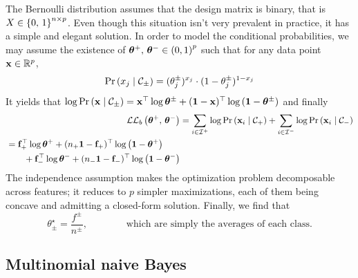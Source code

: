 The Bernoulli distribution assumes that the design matrix is binary,
that is $X \in \left\{ 0,\, 1 \right\}^{n \times p}$.
Even though this situation isn't very prevalent in practice, it has a simple and elegant solution.
In order to model the conditional probabilities, we may assume the existence of
$\bm{\theta}^+,\, \bm{\theta}^- \in \left( 0, 1 \right)^p$
such that for any data point $\mathbf{x} \in \mathbb{R}^p$,
\begin{equation*}
    \Pr\left( x_j \mid \mathcal{C}_\pm \right) = (\theta^\pm_j)^{x_j} \cdot (1 - \theta^\pm_j)^{1 - x_j}
\end{equation*}
It yields that $\log \Pr\left( \mathbf{x} \mid \mathcal{C}_\pm \right) =
\mathbf{x}^\top\log\bm{\theta}^\pm + (\mathbf{1} - \mathbf{x})^\top\log\left( \mathbf{1} - \bm{\theta}^\pm \right)$
and finally
\begin{align}\label{eq:bernoulli_snb_ll}
    \mathcal{L}\mathcal{L}_b\left( \bm{\theta}^+,\, \bm{\theta}^- \right)
    &= \sum_{i \in \mathcal{I}^+} \log \Pr\left( \mathbf{x}_i \mid \mathcal{C}_+ \right)
        + \sum_{i \in \mathcal{I}^-} \log \Pr\left( \mathbf{x}_i \mid \mathcal{C}_- \right)\nonumber\\
    \begin{split}
        &= \mathbf{f}_+^\top\log\bm{\theta}^+ + (n_+\mathbf{1} - \mathbf{f}_+)^\top\log\left( \mathbf{1} - \bm{\theta}^+ \right)\\
        &\qquad+ \mathbf{f}_-^\top\log\bm{\theta}^- + (n_-\mathbf{1} - \mathbf{f}_-)^\top\log\left( \mathbf{1} - \bm{\theta}^- \right)
    \end{split}
\end{align}
The independence assumption makes the optimization problem decomposable across features;
it reduces to $p$ simpler maximizations, each of them being concave and admitting a closed-form solution.
Finally, we find that
\begin{equation*}
    \theta_\pm^\star = \frac{f^\pm}{n^\pm}
    ,\qquad\qquad
    \text{which are simply the averages of each class.}
\end{equation*}

\subsection{Multinomial naive Bayes}\label{subsec:mnb}

